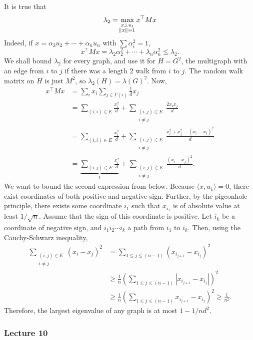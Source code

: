 			It is true that
			\[ \lambda_2 = \max_{\substack{x \perp u_1 \\ \norm{x} = 1}} x^\top M x \]
			Indeed, if $x = \alpha_2 u_2 + \cdots + \alpha_n u_n$ with $\sum \alpha_i^2 = 1$,
			\[ x^\top M x = \lambda_2 \alpha_2^2 + \cdots + \lambda_n \alpha_n^2 \le \lambda_2. \]
			We shall bound $\lambda_2$ for every graph, and use it for $H = G^2$, the multigraph with an edge from $i$ to $j$ if there was a length $2$ walk from $i$ to $j$. The random walk matrix on $H$ is just $M^2$, so $\lambda_2(H) = \lambda(G)^2$. Now,
			\begin{align*}
				x^\top M x &= \sum_i x_i \sum_{j \in \Gamma(i)} \frac{1}{d} x_j \\
					&= \sum_{(i,i) \in E} \frac{x_i^2}{d} + \sum_{\substack{(i,j) \in E \\ i \ne j}} \frac{2x_ix_j}{d} \\
					&= \sum_{(i,i) \in E} \frac{x_i^2}{d} + \sum_{\substack{(i,j) \in E \\ i \ne j}} \frac{x_i^2 + x_j^2 - (x_i - x_j)^2}{d} \\
					&= \underbrace{\sum_{(i,j) \in E} \frac{x_i^2}{d}}_{1} + \sum_{\substack{(i,j) \in E \\ i \ne j}} \frac{(x_i-x_j)^2}{d}.
			\end{align*}
			We want to bound the second expression from below. Because $\langle x,u_1\rangle = 0$, there exist coordinates of both positive and negative sign. Further, by the pigeonhole principle, there exists some coordinate $i_1$ such that $x_{i_1}$ is of absolute value at least $1/\sqrt{n}$. Assume that the sign of this coordinate is positive. Let $i_k$ be a coordinate of negative sign, and $i_1 i_2 \cdots i_k$ a path from $i_1$ to $i_k$. Then, using the Cauchy-Schwarz inequality,
			\begin{align*}
				\sum_{\substack{(i,j) \in E \\ i \ne j}} (x_i-x_j)^2 &= \sum_{1 \le j \le (n-1)} (x_{i_{j+1}} - x_{i_{j}})^2 \\
					&\ge \frac{1}{n} \left(\sum_{1 \le j \le (n-1)} |x_{i_{j+1}} - x_{i_j}|\right)^2 \\
					&\ge \frac{1}{n} \left(\sum_{1 \le j \le (n-1)} x_{i_{j+1}} - x_{i_j}\right)^2 \ge \frac{1}{n^2}.
			\end{align*}
			Therefore, the largest eigenvalue of any graph is at most $1 - 1/nd^2$.

		\subsubsection{Lecture 10}

